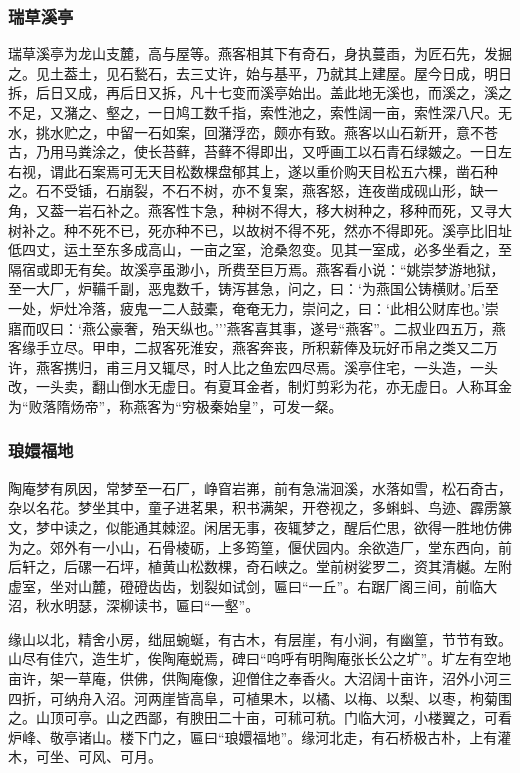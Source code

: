 \documentclass[]{article}
\begin{document}
\hypertarget{header-n656}{%
\subsubsection{瑞草溪亭}\label{header-n656}}

瑞草溪亭为龙山支麓，高与屋等。燕客相其下有奇石，身执蔓臿，为匠石先，发掘之。见土葢土，见石甃石，去三丈许，始与基平，乃就其上建屋。屋今日成，明日拆，后日又成，再后日又拆，凡十七变而溪亭始出。盖此地无溪也，而溪之，溪之不足，又潴之、壑之，一日鸠工数千指，索性池之，索性阔一亩，索性深八尺。无水，挑水贮之，中留一石如案，回潴浮峦，颇亦有致。燕客以山石新开，意不苍古，乃用马粪涂之，使长苔藓，苔藓不得即出，又呼画工以石青石绿皴之。一日左右视，谓此石案焉可无天目松数棵盘郁其上，遂以重价购天目松五六棵，凿石种之。石不受锸，石崩裂，不石不树，亦不复案，燕客怒，连夜凿成砚山形，缺一角，又葢一岩石补之。燕客性卞急，种树不得大，移大树种之，移种而死，又寻大树补之。种不死不已，死亦种不已，以故树不得不死，然亦不得即死。溪亭比旧址低四丈，运土至东多成高山，一亩之室，沧桑忽变。见其一室成，必多坐看之，至隔宿或即无有矣。故溪亭虽渺小，所费至巨万焉。燕客看小说：``姚崇梦游地狱，至一大厂，炉鞴千副，恶鬼数千，铸泻甚急，问之，曰：`为燕国公铸横财。'后至一处，炉灶冷落，疲鬼一二人鼓橐，奄奄无力，崇问之，曰：`此相公财库也。'崇寤而叹曰：`燕公豪奢，殆天纵也。'''燕客喜其事，遂号``燕客''。二叔业四五万，燕客缘手立尽。甲申，二叔客死淮安，燕客奔丧，所积薪俸及玩好币帛之类又二万许，燕客携归，甫三月又辄尽，时人比之鱼宏四尽焉。溪亭住宅，一头造，一头改，一头卖，翻山倒水无虚日。有夏耳金者，制灯剪彩为花，亦无虚日。人称耳金为``败落隋炀帝''，称燕客为``穷极秦始皇''，可发一粲。

\hypertarget{header-n661}{%
\subsubsection{琅嬛福地}\label{header-n661}}

陶庵梦有夙因，常梦至一石厂，峥窅岩岪，前有急湍洄溪，水落如雪，松石奇古，杂以名花。梦坐其中，童子进茗果，积书满架，开卷视之，多蝌蚪、鸟迹、霹雳篆文，梦中读之，似能通其棘涩。闲居无事，夜辄梦之，醒后伫思，欲得一胜地仿佛为之。郊外有一小山，石骨棱砺，上多筠篁，偃伏园内。余欲造厂，堂东西向，前后轩之，后磥一石坪，植黄山松数棵，奇石峡之。堂前树娑罗二，资其清樾。左附虚室，坐对山麓，磴磴齿齿，划裂如试剑，匾曰``一丘''。右踞厂阁三间，前临大沼，秋水明瑟，深柳读书，匾曰``一壑''。

缘山以北，精舍小房，绌屈蜿蜒，有古木，有层崖，有小涧，有幽篁，节节有致。山尽有佳穴，造生圹，俟陶庵蜕焉，碑曰``呜呼有明陶庵张长公之圹''。圹左有空地亩许，架一草庵，供佛，供陶庵像，迎僧住之奉香火。大沼阔十亩许，沼外小河三四折，可纳舟入沼。河两崖皆高阜，可植果木，以橘、以梅、以梨、以枣，枸菊围之。山顶可亭。山之西鄙，有腴田二十亩，可秫可秔。门临大河，小楼翼之，可看炉峰、敬亭诸山。楼下门之，匾曰``琅嬛福地''。缘河北走，有石桥极古朴，上有灌木，可坐、可风、可月。
\end{document}
